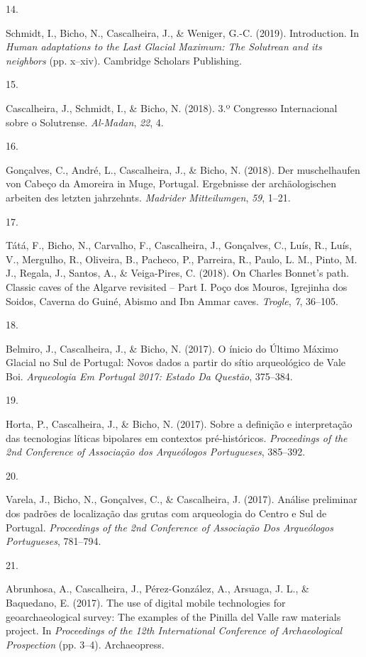 \documentclass[11pt,a4paper,]{awesome-cv}
\newlength{\cslhangindent}
\newlength{\csllabelwidth}
\newenvironment{CSLReferences}[2] %
 {\begin{list}{}{%
  \setlength{\itemindent}{0pt}
  \setlength{\leftmargin}{0pt}
  \setlength{\parsep}{0pt}
  \ifodd #1
   \setlength{\leftmargin}{\cslhangindent}
   \setlength{\itemindent}{-1\cslhangindent}
  \fi
  \setlength{\itemsep}{#2\baselineskip}}}
 {\end{list}}
\newcommand{\CSLLeftMargin}[1]{\parbox[t]{\csllabelwidth}{\strut#1\strut}}
\newcommand{\CSLRightInline}[1]{\parbox[t]{\linewidth - \csllabelwidth}{\strut#1\strut}}
\begin{document}
\begin{CSLReferences}{0}{0}
\CSLLeftMargin{14. }%
\CSLRightInline{Schmidt, I., Bicho, N., Cascalheira, J., \& Weniger,
G.-C. (2019). Introduction. In \emph{Human adaptations to the Last
Glacial Maximum: The Solutrean and its neighbors} (pp. x--xiv).
Cambridge Scholars Publishing.}

\CSLLeftMargin{15. }%
\CSLRightInline{Cascalheira, J., Schmidt, I., \& Bicho, N. (2018). 3.º
Congresso Internacional sobre o Solutrense. \emph{Al-Madan}, \emph{22},
4.}

\CSLLeftMargin{16. }%
\CSLRightInline{Gonçalves, C., André, L., Cascalheira, J., \& Bicho, N.
(2018). Der muschelhaufen von Cabeço da Amoreira in Muge, Portugal.
Ergebnisse der archäologischen arbeiten des letzten jahrzehnts.
\emph{Madrider Mitteilumgen}, \emph{59}, 1--21.}

\CSLLeftMargin{17. }%
\CSLRightInline{Tátá, F., Bicho, N., Carvalho, F., Cascalheira, J.,
Gonçalves, C., Luís, R., Luís, V., Mergulho, R., Oliveira, B., Pacheco,
P., Parreira, R., Paulo, L. M., Pinto, M. J., Regala, J., Santos, A., \&
Veiga-Pires, C. (2018). On Charles Bonnet's path. Classic caves of the
Algarve revisited -- Part I. Poço dos Mouros, Igrejinha dos Soidos,
Caverna do Guiné, Abismo and Ibn Ammar caves. \emph{Trogle}, \emph{7},
36--105.}

\CSLLeftMargin{18. }%
\CSLRightInline{Belmiro, J., Cascalheira, J., \& Bicho, N. (2017). O
ínicio do Último Máximo Glacial no Sul de Portugal: Novos dados a partir
do sítio arqueológico de Vale Boi. \emph{Arqueologia Em Portugal 2017:
Estado Da Questão}, 375--384.}

\CSLLeftMargin{19. }%
\CSLRightInline{Horta, P., Cascalheira, J., \& Bicho, N. (2017). Sobre a
definição e interpretação das tecnologias líticas bipolares em contextos
pré‑­históricos. \emph{Proceedings of the 2nd Conference of Associação
dos Arqueólogos Portugueses}, 385--392.}

\CSLLeftMargin{20. }%
\CSLRightInline{Varela, J., Bicho, N., Gonçalves, C., \& Cascalheira, J.
(2017). Análise preliminar dos padrões de localização das grutas com
arqueologia do Centro e Sul de Portugal. \emph{Proceedings of the 2nd
Conference of Associação Dos Arqueólogos Portugueses}, 781--794.}

\CSLLeftMargin{21. }%
\CSLRightInline{Abrunhosa, A., Cascalheira, J., Pérez-González, A.,
Arsuaga, J. L., \& Baquedano, E. (2017). The use of digital mobile
technologies for geoarchaeological survey: The examples of the Pinilla
del Valle raw materials project. In \emph{Proceedings of the 12th
International Conference of Archaeological Prospection} (pp. 3--4).
Archaeopress.}


\end{CSLReferences}
\end{document}
